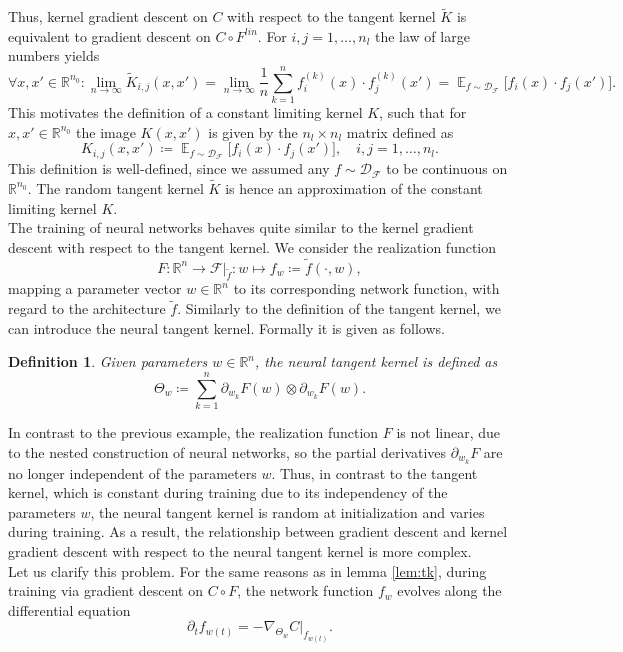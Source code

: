 \documentclass[11pt, a4paper]{article}
\newtheorem{definition}[theorem]{Definition}
\newcommand{\R}{\mathbb{R}}
\newcommand{\D}{\mathcal{D}}
\newcommand{\F}{\mathcal{F}}
\DeclareMathOperator*{\E}{\mathbb{E}}
\begin{document}
Thus, kernel gradient descent on $C$ with respect to the tangent kernel $\tilde{K}$ is equivalent to gradient descent on $C \circ F^\textit{lin}$. For $i,j = 1, \dots, n_l$ the law of large numbers yields
\[ \forall x,x' \in \R^{n_0} : \lim_{n \to \infty} \tilde{K}_{i,j}(x,x') = \lim_{n \to \infty} \frac{1}{n} \sum_{k=1}^{n} f_i^{(k)}(x) \cdot f_j^{(k)}(x') = \E_{f \sim \D_{\F}} \Big [ f_i(x) \cdot f_j(x') \Big ]. \]
This motivates the definition of a constant limiting kernel $K$, such that for $x,x' \in \R^{n_0}$ the image $K(x,x')$ is given by the $n_l \times n_l$ matrix defined as
\[ K_{i,j}(x,x') \coloneq \E_{f \sim \D_{\F}} \Big [ f_i(x) \cdot f_j(x') \Big ], \quad i,j=1,\dots,n_l. \]
This definition is well-defined, since we assumed any $f \sim \D_\F$ to be continuous on $\R^{n_0}$. The random tangent kernel $\tilde{K}$ is hence an approximation of the constant limiting kernel $K$. \\

The training of neural networks behaves quite similar to the kernel gradient descent with respect to the tangent kernel. We consider the realization function
\[ F: \R^n \to \F|_{\tilde{f}} : w \mapsto f_w \coloneq \tilde{f}(\cdot,w), \]
 mapping a parameter vector $w \in \R^n$ to its corresponding network function, with regard to the architecture $\tilde{f}$. Similarly to the definition of the tangent kernel, we can introduce the neural tangent kernel. Formally it is given as follows.
 
\begin{definition} \label{def:ntk}
Given parameters $w \in \R^n$, the neural tangent kernel is defined as
\[ \Theta_w \coloneq \sum_{k=1}^{n} \partial_{w_k} F(w) \otimes \partial_{w_k} F(w). \]
\end{definition}

In contrast to the previous example, the realization function $F$ is not linear, due to the nested construction of neural networks, so the partial derivatives $\partial_{w_k}F$ are no longer independent of the parameters $w$. Thus, in contrast to the tangent kernel, which is constant during training due to its independency of the parameters $w$, the neural tangent kernel is random at initialization and varies during training. As a result, the relationship between gradient descent and kernel gradient descent with respect to the neural tangent kernel is more complex. \\

Let us clarify this problem. For the same reasons as in lemma \ref{lem:tk}, during training via gradient descent on $C \circ F$, the network function $f_w$ evolves along the differential equation
\[ \partial_tf_{w(t)} = -\nabla_{\Theta_w}C|_{f_{w(t)}}. \]
\end{document}
